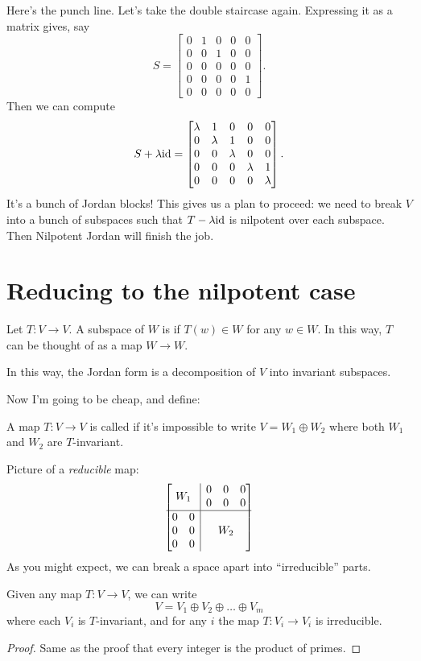 Here's the punch line.
Let's take the double staircase again.
Expressing it as a matrix gives, say
\[
	S = \begin{bmatrix}
		0 & 1 & 0 & 0 & 0 \\
		0 & 0 & 1 & 0 & 0 \\
		0 & 0 & 0 & 0 & 0 \\
		0 & 0 & 0 & 0 & 1 \\
		0 & 0 & 0 & 0 & 0
	\end{bmatrix}.
\]
Then we can compute
\[
	S + \lambda \mathrm{id} = \begin{bmatrix}
		\lambda & 1 & 0 & 0 & 0 \\
		0 & \lambda & 1 & 0 & 0 \\
		0 & 0 & \lambda & 0 & 0 \\
		0 & 0 & 0 & \lambda & 1 \\
		0 & 0 & 0 & 0 & \lambda
	\end{bmatrix}.
\]
It's a bunch of Jordan blocks!
This gives us a plan to proceed: we need to break $V$ into
a bunch of subspaces such that $T - \lambda \mathrm{id}$ is nilpotent over each subspace.
Then Nilpotent Jordan will finish the job.

\section{Reducing to the nilpotent case}
\begin{definition}
	Let $T : V \to V$. A subspace of $W$ is 
	if $T(w) \in W$ for any $w \in W$.
	In this way, $T$ can be thought of as a map $W \to W$.
\end{definition}
In this way, the Jordan form is a decomposition of $V$ into invariant subspaces.

Now I'm going to be cheap, and define:
\begin{definition}
	A map $T : V \to V$ is called  if it's impossible to write $V = W_1 \oplus W_2$
	where both $W_1$ and $W_2$ are $T$-invariant.
\end{definition}
Picture of a \emph{reducible} map:
\[ 
	\begin{bmatrix}
		\multicolumn{2}{c|}{\multirow{2}{*}{$W_1$}} & 0 & 0 & 0  \\ 
		\multicolumn{2}{c|}{} & 0 & 0 & 0 \\ \hline
		0 & 0 & \multicolumn{3}{|c}{\multirow{3}{*}{$W_2$}} \\
		0 & 0 & \multicolumn{3}{|c}{} \\
		0 & 0 & \multicolumn{3}{|c}{} 
	\end{bmatrix}
\]
As you might expect, we can break a space apart into ``irreducible'' parts.
\begin{proposition}
	Given any map $T: V \to V$, we can write
	\[ V = V_1 \oplus V_2 \oplus \dots \oplus V_m \]
	where each $V_i$ is $T$-invariant, and for any $i$ the map $T : V_i \to V_i$ is irreducible.
\end{proposition}
\begin{proof}
	Same as the proof that every integer is the product of primes.
\end{proof}

